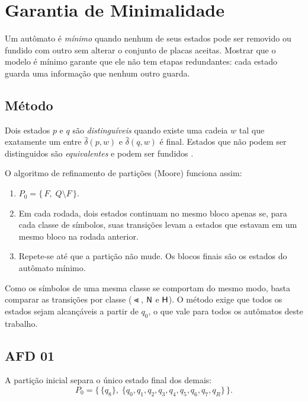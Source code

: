 \section{Garantia de Minimalidade}
\label{sec:minimizacao}

Um autômato é \emph{mínimo} quando nenhum de seus estados pode ser
removido ou fundido com outro sem alterar o conjunto de placas
aceitas. Mostrar que o modelo é mínimo garante que ele não tem
etapas redundantes: cada estado guarda uma informação que nenhum
outro guarda.

\subsection{Método}

Dois estados $p$ e $q$ são \emph{distinguíveis} quando existe uma
cadeia $w$ tal que exatamente um entre $\hat{\delta}(p,w)$ e
$\hat{\delta}(q,w)$ é final. Estados que não podem ser
distinguidos são \emph{equivalentes} e podem ser fundidos
\cite{hopcroft2002}.

O algoritmo de refinamento de partições (Moore) funciona assim:
\begin{enumerate}
  \item $P_0 = \{\,F,\; Q \setminus F\,\}$.
  \item Em cada rodada, dois estados continuam no mesmo bloco
        apenas se, para cada classe de símbolos, suas transições
        levam a estados que estavam em um mesmo bloco na rodada
        anterior.
  \item Repete-se até que a partição não mude. Os blocos finais
        são os estados do autômato mínimo.
\end{enumerate}

Como os símbolos de uma mesma classe se comportam do mesmo modo,
basta comparar as transições por classe ($\Lt$, $\mathsf{N}$ e $\mathsf{H}$). O
método exige que todos os estados sejam alcançáveis a partir de
$q_0$, o que vale para todos os autômatos deste trabalho.


\subsection{AFD 01}

A partição inicial separa o único estado final dos demais:
\[
  P_0 = \bigl\{\, \{q_8\},\; \{q_0,q_1,q_2,q_3,q_4,q_5,q_6,q_7,q_R\} \,\bigr\}.
\]

